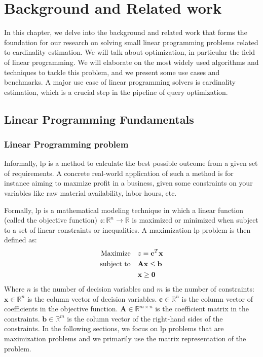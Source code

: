 
\chapter{Background and Related work}\label{chapter:relatedwork}

In this chapter, we delve into the background and
related work that forms the foundation for our research on
solving small linear programming problems related to cardinality estimation.
We will talk about optimization, in particular the field
of linear programming. We will elaborate on
the most widely used algorithms and techniques to tackle this problem,
and we present some use cases and benchmarks.
A major use case of linear programming solvers is cardinality estimation, which
is a crucial step in the pipeline of query optimization.

\section{Linear Programming Fundamentals}

\subsection{Linear Programming problem}
Informally, \gls{lp} is a method to calculate the best possible outcome from a given set
of requirements. A concrete real-world application of such a method is
for instance aiming to maxmize profit in a business, given some constraints on your variables
like raw material availability, labor hours, etc.

Formally, \gls{lp} is a mathematical modeling technique in which
a linear function (called the objective function) \( z: \mathbb{R}^n \to \mathbb{R} \)
is maximized or minimized when subject to a set of linear constraints or inequalities.
A maximization \gls{lp} problem is then defined as:
\begin{align}
    \text{Maximize} \quad   & z = \mathbf{c}^T \mathbf{x} \notag            \\
    \text{subject to} \quad & \mathbf{A} \mathbf{x} \leq \mathbf{b} \notag  \\
                            & \mathbf{x} \geq \mathbf{0} \label{LP_Problem}
\end{align}
Where $n$ is the number of decision variables and $m$ is the number of constraints:
\(\mathbf{x} \in \mathbb{R}^n\) is the column vector of decision variables.
\(\mathbf{c} \in \mathbb{R}^n\) is the column vector of coefficients in the objective function.
\(\mathbf{A} \in \mathbb{R}^{m \times n}\) is the coefficient matrix in the constraints.
\(\mathbf{b} \in \mathbb{R}^m\) is the column vector of the right-hand sides of the constraints.
In the following sections, we focus on \gls{lp} problems that are maximization problems and we primarily
use the matrix representation of the problem.

